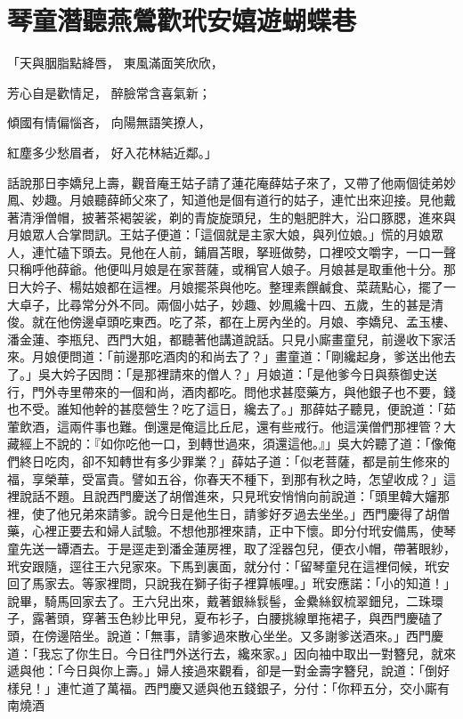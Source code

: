 %

\chapter{琴童潛聽燕鶯歡\KG 玳安嬉遊蝴蝶巷}

「天與胭脂點絳唇，  東風滿面笑欣欣，

芳心自是歡情足，  醉臉常含喜氣新；

傾國有情偏惱吝，  向陽無語笑撩人，

紅塵多少愁眉者，  好入花林結近鄰。」

話說那日李嬌兒上壽，觀音庵王姑子請了蓮花庵薛姑子來了，又帶了他兩個徒弟妙鳳、妙趣。月娘聽薛師父來了，知道他是個有道行的姑子，連忙出來迎接。見他戴著清淨僧帽，披著茶褐袈裟，剃的青旋旋頭兒，生的魁肥胖大，沿口豚腮，進來與月娘眾人合掌問訊。王姑子便道：「這個就是主家大娘，與列位娘。」慌的月娘眾人，連忙磕下頭去。見他在人前，鋪眉苫眼，拏班做勢，口裡咬文嚼字，一口一聲只稱呼他薛爺。他便叫月娘是在家菩薩，或稱官人娘子。月娘甚是取重他十分。那日大妗子、楊姑娘都在這裡。月娘擺茶與他吃。整理素饌鹹食、菜蔬點心，擺了一大卓子，比尋常分外不同。兩個小姑子，妙趣、妙鳳纔十四、五歲，生的甚是清俊。就在他傍邊卓頭吃東西。吃了茶，都在上房內坐的。月娘、李嬌兒、孟玉樓、潘金蓮、李瓶兒、西門大姐，都聽著他講道說話。只見小廝畫童兒，前邊收下家活來。月娘便問道：「前邊那吃酒肉的和尚去了？」畫童道：「剛纔起身，爹送出他去了。」吳大妗子因問：「是那裡請來的僧人？」月娘道：「是他爹今日與蔡御史送行，門外寺里帶來的一個和尚，酒肉都吃。問他求甚麼藥方，與他銀子也不要，錢也不受。誰知他幹的甚麼營生？吃了這日，纔去了。」那薛姑子聽見，便說道：「茹葷飲酒，這兩件事也難。倒還是俺這比丘尼，還有些戒行。他這漢僧們那裡管？大藏經上不說的：『如你吃他一口，到轉世過來，須還這他。』」吳大妗聽了道：「像俺們終日吃肉，卻不知轉世有多少罪業？」薛姑子道：「似老菩薩，都是前生修來的福，享榮華，受富貴。譬如五谷，你春天不種下，到那有秋之時，怎望收成？」這裡說話不題。且說西門慶送了胡僧進來，只見玳安悄悄向前說道：「頭里韓大嬸那裡，使了他兄弟來請爹。說今日是他生日，請爹好歹過去坐坐。」西門慶得了胡僧藥，心裡正要去和婦人試驗。不想他那裡來請，正中下懷。即分付玳安備馬，使琴童先送一罈酒去。于是逕走到潘金蓮房裡，取了淫器包兒，便衣小帽，帶著眼紗，玳安跟隨，逕往王六兒家來。下馬到裏面，就分付：「留琴童兒在這裡伺候，玳安回了馬家去。等家裡問，只說我在獅子街子裡算帳哩。」玳安應諾：「小的知道！」說畢，騎馬回家去了。王六兒出來，戴著銀絲䯼髻，金纍絲釵梳翠鈿兒，二珠環子，露著頭，穿著玉色紗比甲兒，夏布衫子，白腰挑線單拖裙子，與西門慶磕了頭，在傍邊陪坐。說道：「無事，請爹過來散心坐坐。又多謝爹送酒來。」西門慶道：「我忘了你生日。今日往門外送行去，纔來家。」因向袖中取出一對簪兒，就來遞與他：「今日與你上壽。」婦人接過來觀看，卻是一對金壽字簪兒，說道：「倒好樣兒！」連忙道了萬福。西門慶又遞與他五錢銀子，分付：「你秤五分，交小廝有南燒酒 
